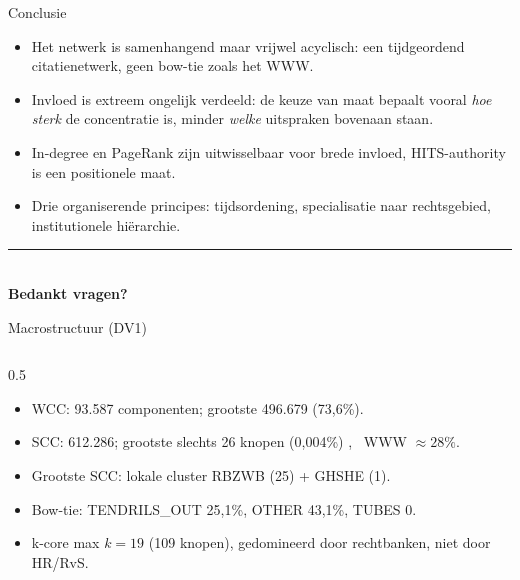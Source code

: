 \documentclass[aspectratio=169,11pt]{beamer}
\newcommand{\rd}[1]{\textcolor{uvared}{#1}}
\begin{document}
\begin{frame}{Conclusie}
  \begin{itemize}
    \item Het netwerk is \rd{samenhangend maar vrijwel acyclisch}: een tijdgeordend citatienetwerk, geen bow-tie zoals het WWW.
    \item Invloed is \rd{extreem ongelijk} verdeeld: de keuze van maat bepaalt vooral \emph{hoe sterk} de concentratie is, minder \emph{welke} uitspraken bovenaan staan.
    \item In-degree en PageRank zijn uitwisselbaar voor brede invloed, HITS-authority is een positionele maat.
    \item Drie organiserende principes: \rd{tijdsordening}, \rd{specialisatie naar rechtsgebied}, \rd{institutionele hi\"erarchie}.
  \end{itemize}
  \vspace{0.5em}
  \centering
  {\color{uvared}\rule{0.6\textwidth}{0.6pt}}\\[0.4em]
  \textbf{Bedankt \textemdash{} vragen?}
\end{frame}




\begin{frame}{Macrostructuur (DV1)}
  \footnotesize
  \begin{columns}[T]
    \begin{column}{0.5\textwidth}
      \begin{itemize}
        \item WCC: 93.587 componenten; grootste \rd{496.679 (73,6\%)}.
        \item SCC: 612.286; grootste slechts \rd{26 knopen (0,004\%)} , \ WWW $\approx 28\%$.
        \item Grootste SCC: lokale cluster RBZWB (25) + GHSHE (1).
        \item Bow-tie: TENDRILS\_OUT 25,1\%, OTHER 43,1\%, TUBES 0.
        \item k-core max $k=19$ (109 knopen), \rd{gedomineerd door rechtbanken}, niet door HR/RvS.
      \end{itemize}
    \end{column}
  \end{columns}
\end{frame}
\end{document}
